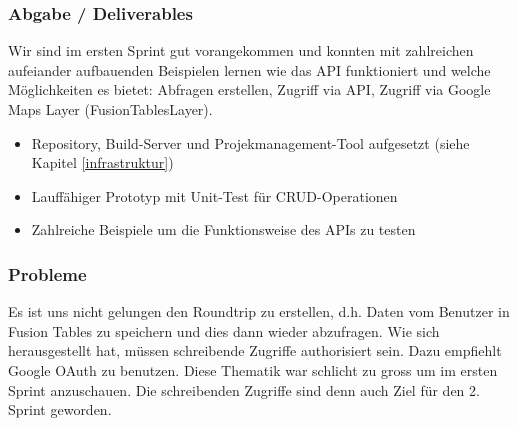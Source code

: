 \subsubsection{Abgabe / Deliverables}
Wir sind im ersten Sprint gut vorangekommen und konnten mit zahlreichen aufeiander aufbauenden Beispielen lernen wie das API funktioniert und welche Möglichkeiten es bietet: Abfragen erstellen, Zugriff via API, Zugriff via Google Maps Layer (FusionTablesLayer).

\begin{itemize}
	\item Repository, Build-Server und Projekmanagement-Tool aufgesetzt (siehe Kapitel \ref{infrastruktur})
	\item Lauffähiger Prototyp mit Unit-Test für CRUD-Operationen
	\item Zahlreiche Beispiele um die Funktionsweise des APIs zu testen
\end{itemize}

\subsubsection{Probleme}
Es ist uns nicht gelungen den Roundtrip zu erstellen, d.h. Daten vom Benutzer in Fusion Tables zu speichern und dies dann wieder abzufragen. Wie sich herausgestellt hat, müssen schreibende Zugriffe authorisiert sein. Dazu empfiehlt Google OAuth zu benutzen. Diese Thematik war schlicht zu gross um im ersten Sprint anzuschauen. Die schreibenden Zugriffe sind denn auch Ziel für den 2. Sprint geworden. 